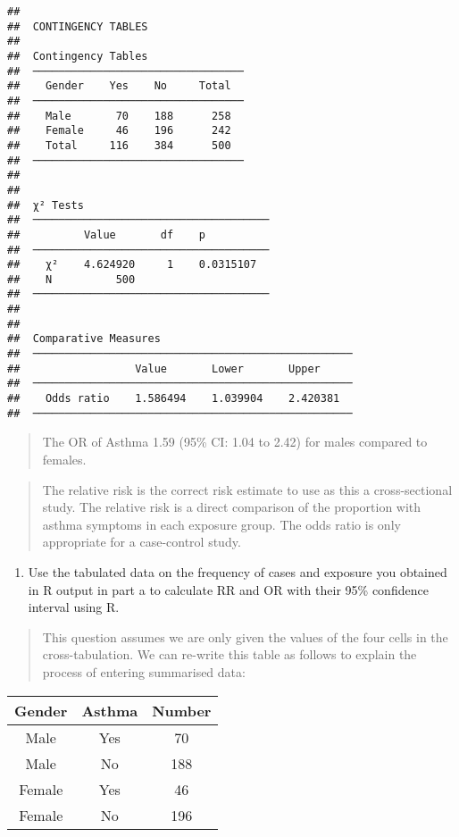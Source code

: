 \documentclass[
]{memoir}
\providecommand{\tightlist}{%
  \setlength{\itemsep}{0pt}\setlength{\parskip}{0pt}}
\begin{document}
\begin{verbatim}
## 
##  CONTINGENCY TABLES
## 
##  Contingency Tables                
##  ───────────────────────────────── 
##    Gender    Yes    No     Total   
##  ───────────────────────────────── 
##    Male       70    188      258   
##    Female     46    196      242   
##    Total     116    384      500   
##  ───────────────────────────────── 
## 
## 
##  χ² Tests                              
##  ───────────────────────────────────── 
##          Value       df    p           
##  ───────────────────────────────────── 
##    χ²    4.624920     1    0.0315107   
##    N          500                      
##  ───────────────────────────────────── 
## 
## 
##  Comparative Measures                               
##  ────────────────────────────────────────────────── 
##                  Value       Lower       Upper      
##  ────────────────────────────────────────────────── 
##    Odds ratio    1.586494    1.039904    2.420381   
##  ──────────────────────────────────────────────────
\end{verbatim}

\begin{quote}
The OR of Asthma 1.59 (95\% CI: 1.04 to 2.42) for males compared to females.
\end{quote}

\begin{quote}
The relative risk is the correct risk estimate to use as this a cross-sectional study. The relative risk is a direct comparison of the proportion with asthma symptoms in each exposure group. The odds ratio is only appropriate for a case-control study.
\end{quote}

\begin{enumerate}
\def\labelenumi{\alph{enumi})}
\setcounter{enumi}{1}
\tightlist
\item
  Use the tabulated data on the frequency of cases and exposure you obtained in R output in part a to calculate RR and OR with their 95\% confidence interval using R.
\end{enumerate}

\begin{quote}
This question assumes we are only given the values of the four cells in the cross-tabulation. We can re-write this table as follows to explain the process of entering summarised data:
\end{quote}

\begin{longtable}[]{@{}ccc@{}}
\toprule
Gender & Asthma & Number \\
\midrule
\endhead
Male & Yes & 70 \\
Male & No & 188 \\
Female & Yes & 46 \\
Female & No & 196 \\
\bottomrule
\end{longtable}
\end{document}

